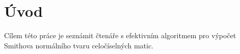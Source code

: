 \chapter*{Úvod}

Cílem této práce je seznámit čtenáře s efektivním algoritmem pro výpočet Smithova normálního tvaru celočíselných matic. 


\cleardoublepage

